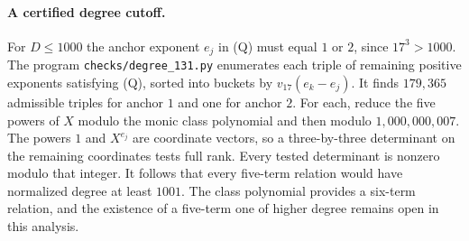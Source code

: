 \paragraph{A certified degree cutoff.}
For $D\le1000$ the anchor exponent $e_j$ in (Q) must equal $1$ or
$2$, since $17^3>1000$. The program
\texttt{checks/degree\_131.py} enumerates each triple of remaining
positive exponents satisfying (Q), sorted into buckets by
$v_{17}(e_k-e_j)$. It finds $179{,}365$ admissible triples for anchor
$1$ and one for anchor $2$. For each, reduce the five powers of $X$
modulo the monic class polynomial and then modulo $1{,}000{,}000{,}007$.
The powers $1$ and $X^{e_j}$ are coordinate vectors, so a
three-by-three determinant on the remaining coordinates tests full
rank. Every tested determinant is nonzero modulo that integer.
It follows that every five-term relation would have normalized degree
at least $1001$. The class polynomial provides a six-term relation,
and the existence of a five-term one of higher degree remains open
in this analysis.
